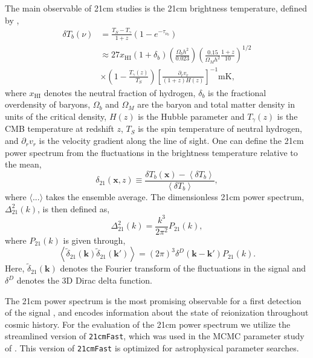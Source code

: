 \documentclass[useAMS,usenatbib]{mnras}
\begin{document}
The main observable of 21cm studies is the 21cm brightness temperature, defined by \citep{Pritchard2012, Furlanetto2006}, 
\begin{equation}
\begin{aligned}
\delta T_b (\nu) &= \frac{T_S - T_\gamma}{1+z} (1- e^{-\tau_{\nu_0}}) \\
&\approx 27 x_\text{HI} (1+\delta_b)\left(\frac{\Omega_b h^2}{0.023}\right) \left(\frac{0.15}{\Omega_M h^2}\frac{1+z}{10}\right)^{1/2}\\
&\times \left(1 - \frac{T_\gamma(z)}{T_S}\right) \left[\frac{\partial_r v_r}{(1+z) H(z)}\right]^{-1} \text{mK},
\end{aligned}
\end{equation}
where $x_\text{HI}$ denotes the neutral fraction of hydrogen, $\delta_b$ is the fractional overdensity of baryons, $\Omega_b$ and $\Omega_M$ are the baryon and total matter density in units of the critical density, $H(z)$ is the Hubble parameter and $T_\gamma(z)$ is the CMB temperature at redshift $z$, $T_S$ is the spin temperature of neutral hydrogen, and $\partial_r v_r$ is the velocity gradient along the line of sight. 
One can define the 21cm power spectrum from the fluctuations in the brightness temperature relative to the mean, 
\begin{equation}
\delta_{21}(\boldsymbol{x}, z) \equiv \frac{\delta T_b(\boldsymbol{x}) - \left\langle\delta T_b\right\rangle}{\left\langle\delta T_b\right\rangle},
\end{equation}
where $\langle...\rangle$ takes the ensemble average.
The dimensionless 21cm power spectrum, $\Delta^2_{21}(k)$, is then defined as, 
\begin{equation}
\Delta^2_{21}(k) =  \frac{k^3}{2\pi^2}P_{21}(k),
\end{equation}
where $P_{21}(k)$ is given through, 
\begin{equation}
\left\langle\tilde{\delta}_{21}(\boldsymbol{k})\tilde{\delta}_{21}(\boldsymbol{k'})\right\rangle = (2\pi)^3 \delta^D(\boldsymbol{k}-\boldsymbol{k'})P_{21}(k).
\end{equation}
Here, $\tilde{\delta}_{21}(\boldsymbol{k})$ denotes the Fourier transform of the fluctuations in the signal and $\delta^D$ denotes the 3D Dirac delta function.

The 21cm power spectrum is the most promising observable for a first detection of the signal \citep{Furlanetto2006}, and encodes information about the state of reionization throughout cosmic history. 
For the evaluation of the 21cm power spectrum we utilize the streamlined version of \texttt{21cmFast}, which was used in the MCMC parameter study of \citet{greig2015}.
This version of \texttt{21cmFast} is optimized for astrophysical parameter searches.
\end{document}
